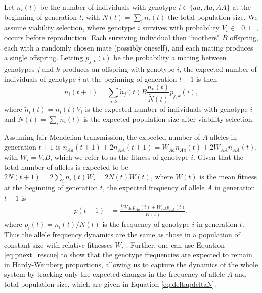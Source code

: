 \documentclass[]{article}
\begin{document}
Let $n_i(t)$ be the number of individuals with genotype $i\in\{aa,Aa,AA\}$ at the beginning of generation $t$, with $N(t) =  \sum_i{n_i(t)}$ the total population size.
We assume viability selection, where genotype $i$ survives with probability $V_i\in[0,1]$, occurs before reproduction.
Each surviving individual then ``mothers" $B$ offspring, each with a randomly chosen mate (possibly oneself), and each mating produces a single offspring. 
Letting $p_{j,k}(i)$ be the probability a mating between genotypes $j$ and $k$ produces an offspring with genotype $i$, the expected number of individuals of genotype $i$ at the beginning of generation $t+1$ is then  
\begin{equation}
n_i(t+1) = \sum_{j,k} \tilde{n}_j(t) B \frac{\tilde{n}_k(t)}{\tilde{N}(t)}p_{j,k}(i),
\end{equation}
where $\tilde{n}_i(t) = n_i(t) V_i$ is the expected number of individuals with genotype $i$ and $\tilde{N}(t) = \sum_i{\tilde{n}_i(t)}$ is the expected population size after viability selection.

Assuming fair Mendelian transmission, the expected number of $A$ alleles in generation $t+1$ is $n_{Aa}(t+1) + 2n_{AA}(t+1) = W_{Aa} n_{Aa}(t) + 2 W_{AA} n_{AA}(t)$,
with $W_i = V_i B$, which we refer to as the fitness of genotype $i$.
Given that the total number of alleles is expected to be $2N(t+1) = 2\sum_i n_i(t) W_i = 2N(t) \overline{W}(t)$, where $\overline{W}(t)$ is the mean fitness at the beginning of generation $t$, the expected frequency of allele $A$ in generation $t+1$ is
\begin{equation}\label{eq:pnext_rescue}
\begin{aligned}
p(t+1) &= \frac{\frac{1}{2} W_{Aa} p_{Aa}(t) + W_{AA} p_{AA}(t)}{\overline{W}(t)},
\end{aligned}
\end{equation}
where $p_i(t)=n_i(t)/N(t)$ is the frequency of genotype $i$ in generation $t$.
Thus the allele frequency dynamics are the same as those in a population of constant size with relative fitnesses $W_i$ \citep[equation 5.2.3 in][]{crow1970introduction}.
Further, one can use Equation \ref{eq:pnext_rescue} to show that the genotype frequencies are expected to remain in Hardy-Weinberg proportions, allowing us to capture the dynamics of the whole system by tracking only the expected changes in the frequency of allele $A$ and total population size, which are given in Equation \ref{eq:deltapdeltaN}.

\end{document}
